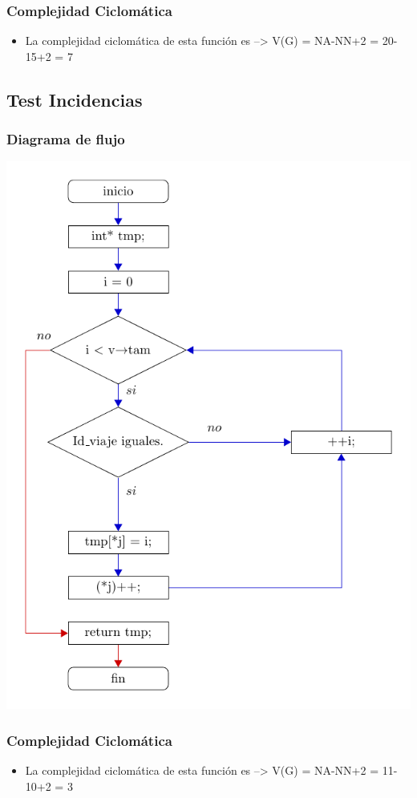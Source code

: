 \subsubsection{Complejidad Ciclomática}
\begin{itemize}
\item La complejidad ciclomática de esta función es --> V(G) = NA-NN+2 = 20-15+2 = 7
\end{itemize}
\newpage
\subsection{Test Incidencias}
\subsubsection{Diagrama de flujo}
\includegraphics[width=\textwidth, angle=0,scale=0.75]{dep/flujolistaincidencia.pdf}
\subsubsection{Complejidad Ciclomática}
\begin{itemize}
\item La complejidad ciclomática de esta función es --> V(G) = NA-NN+2 = 11-10+2 = 3
\end{itemize}
